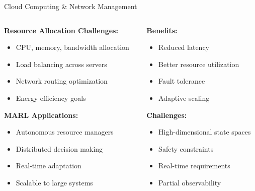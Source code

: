 \documentclass[aspectratio=169]{beamer}
\begin{document}
\begin{frame}{Cloud Computing \& Network Management}
    
    \begin{columns}
        \begin{column}{0.6\textwidth}
            \textbf{Resource Allocation Challenges:}
            \begin{itemize}
                \item CPU, memory, bandwidth allocation
                \item Load balancing across servers
                \item Network routing optimization
                \item Energy efficiency goals
            \end{itemize}
            
            \vfill
            \textbf{MARL Applications:} \autocite{zhang_multi-agent_2025}
            \begin{itemize}
                \item Autonomous resource managers
                \item Distributed decision making
                \item Real-time adaptation
                \item Scalable to large systems
            \end{itemize}
        \end{column}
        \begin{column}{0.4\textwidth}
            \textbf{Benefits:}
            \begin{itemize}
                \item Reduced latency
                \item Better resource utilization
                \item Fault tolerance
                \item Adaptive scaling
            \end{itemize}
            
            \vfill
            \textbf{Challenges:}
            \begin{itemize}
                \item High-dimensional state spaces
                \item Safety constraints
                \item Real-time requirements
                \item Partial observability
            \end{itemize}
        \end{column}
    \end{columns}
\end{frame}
\end{document}
